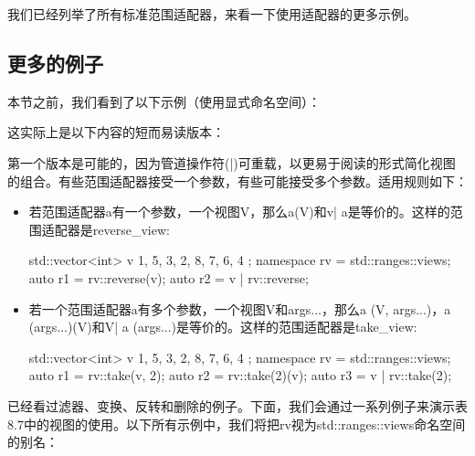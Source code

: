 我们已经列举了所有标准范围适配器，来看一下使用适配器的更多示例。

\subsection{更多的例子}

本节之前，我们看到了以下示例（使用显式命名空间）：


这实际上是以下内容的短而易读版本：


第一个版本是可能的，因为管道操作符(|)可重载，以更易于阅读的形式简化视图的组合。有些范围适配器接受一个参数，有些可能接受多个参数。适用规则如下：

\begin{itemize}
  \item
        若范围适配器a有一个参数，一个视图V，那么a(V)和v| a是等价的。这样的范围适配器是reverse\_view:

        \begin{cpp}
std::vector<int> v{ 1, 5, 3, 2, 8, 7, 6, 4 };
namespace rv = std::ranges::views;
auto r1 = rv::reverse(v);
auto r2 = v | rv::reverse;
\end{cpp}

  \item
        若一个范围适配器a有多个参数，一个视图V和args...，那么a (V, args...)，a (args...)(V)和V| a (args...)是等价的。这样的范围适配器是take\_view:

        \begin{cpp}
std::vector<int> v{ 1, 5, 3, 2, 8, 7, 6, 4 };
namespace rv = std::ranges::views;
auto r1 = rv::take(v, 2);
auto r2 = rv::take(2)(v);
auto r3 = v | rv::take(2);
\end{cpp}

\end{itemize}

已经看过滤器、变换、反转和删除的例子。下面，我们会通过一系列例子来演示表8.7中的视图的使用。以下所有示例中，我们将把rv视为std::ranges::views命名空间的别名：

